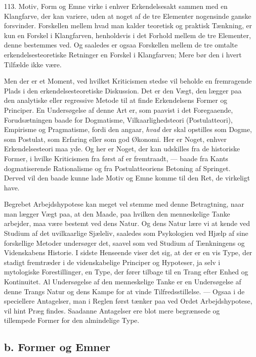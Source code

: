 \documentclass[12pt,a4paper]{book}
\newcommand{\opage}[1]{\marginnote{\footnotesize\textit{[#1]}}}
\newcommand{\apage}[1]{\marginnote{\footnotesize\textit{[#1]}}}
\begin{document}
113. Motiv, Form og Emne virke i enhver Erkendelsesakt sammen med en Klangfarve,
der kan variere, uden at noget af de tre Elementer nogensinde ganske forsvinder.
Forskellen mellem hvad man kalder teoretisk og praktisk Tænkning, er kun en Forskel
i Klangfarven, henholdsvis i det Forhold mellem de tre Elementer, denne bestemmes
ved. Og saaledes er ogsaa Forskellen mellem de tre omtalte \apage{273} erkendelsesteoretiske
Retninger en Forskel i Klangfarven; Mere bør den i hvert Tilfælde ikke være.

Men der er et Moment, ved hvilket Kriticismen stedse vil beholde en fremragende
Plads i den erkendelsesteoretiske Diskussion. Det er den Vægt, den lægger paa den
analytiske eller regressive Metode til at finde Erkendelsens Former og Principer. En
Undersøgelse af denne Art er, som paavist i det Foregaaende, Forudsætningen baade
for Dogmatisme, Vilkaarlighedsteori (Postulatteori), Empirisme og Pragmatisme,
fordi den angaar, \emph{hvad} der skal opstilles som Dogme, som Postulat, som
Erfaring eller som god Økonomi. Her er Noget, enhver Erkendelsesteori maa yde. Og
her er Noget, der kan udskilles fra de historiske Former, i hvilke Kriticismen fra
først af er fremtraadt, --- baade fra Kants dogmatiserende Rationalisme og fra
Postulatteoriens Betoning af Springet. Derved vil den baade kunne lade Motiv og
Emne komme til den Ret, de virkeligt have.

Begrebet Arbejdshypotese kan meget vel stemme med denne Betragtning, naar man
lægger Vægt paa, at den Maade, paa hvilken den menneskelige Tanke arbejder, maa være
bestemt ved dens Natur. Og dens Natur lære vi at kende ved Studium af det
uvilkaarlige Sjæleliv, saaledes som Psykologien ved Hjælp af sine forskellige
Metoder undersøger det, saavel som ved Studium af Tænkningens og Videnskabens
Historie. I sidste Henseende viser det sig, at der er en vis Type, der stadigt
fremtræder i de videnskabelige Principer og Hypoteser, ja selv i mytologiske
Forestillinger, en Type, der fører tilbage til en Trang efter Enhed og Kontinuitet.
Al Undersøgelse af den menneskelige Tanke er en Undersøgelse af denne Trangs Natur
og dens Kampe for at vinde Tilfredsstillelse. --- Ogsaa i de speciellere Antagelser,
man i Reglen først tænker paa ved Ordet Arbejdshypotese, vil hint Præg findes.
Saadanne Antagelser ere blot mere begrænsede og tillempede Former for den
almindelige Type.

\opage{274} \subsection*{b. Former og Emner}
\end{document}
